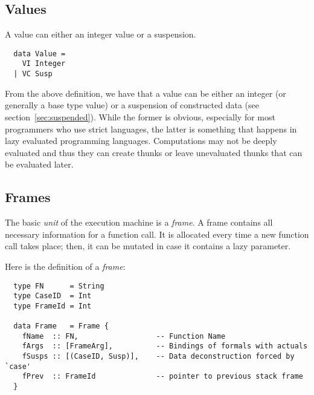 \documentclass[diploma]{softlab-thesis}
\begin{document}
\subsection{Values}
\label{sec:values}

A value can either an integer value or a suspension.

\begin{verbatim}
  data Value = 
    VI Integer 
  | VC Susp 
\end{verbatim}

From the above definition, we have that a value can be either an integer (or generally a base type 
value) or a suspension of constructed data (see section~\ref{sec:suspended}). While the former is obvious, especially 
for most programmers who use strict languages, the latter is something that happens in lazy evaluated 
programming languages. Computations may not be deeply evaluated and thus they can create thunks or 
leave unevaluated thunks that can be evaluated later.

\subsection{Frames}
\label{sec:frames}

The basic \textit{unit} of the execution machine is a \textit{frame}. A frame contains all necessary information 
for a function call. It is allocated every time a new function call takes place; then, it can be mutated in case it contains
a lazy parameter.

Here is the definition of a \textit{frame}:
\begin{verbatim}
  type FN      = String 
  type CaseID  = Int 
  type FrameId = Int 

  data Frame   = Frame {
    fName  :: FN,                  -- Function Name
    fArgs  :: [FrameArg],          -- Bindings of formals with actuals
    fSusps :: [(CaseID, Susp)],    -- Data deconstruction forced by `case'
    fPrev  :: FrameId              -- pointer to previous stack frame 
  }
\end{verbatim}
\end{document}
